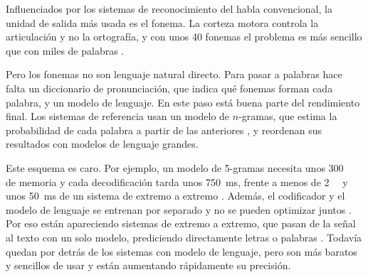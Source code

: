 Influenciados por los sistemas de reconocimiento del habla convencional, la unidad de salida más usada es el fonema. La corteza motora controla la articulación y no la ortografía, y con unos 40 fonemas el problema es más sencillo que con miles de palabras \cite{willett2023}.

Pero los fonemas no son lenguaje natural directo. Para pasar a palabras hace falta un diccionario de pronunciación, que indica qué fonemas forman cada palabra, y un modelo de lenguaje. En este paso está buena parte del rendimiento final. Los sistemas de referencia usan un modelo de $n$-gramas, que estima la probabilidad de cada palabra a partir de las anteriores \cite{jurafsky2026slp}, y reordenan sus resultados con modelos de lenguaje grandes.

Este esquema es caro. Por ejemplo, un modelo de 5-gramas necesita unos \SI{300}{\giga\byte} de memoria y cada decodificación tarda unos \SI{750}{\milli\second}, frente a menos de \SI{2}{\giga\byte} y unos \SI{50}{\milli\second} de un sistema de extremo a extremo \cite{brainwhisperer}. Además, el codificador y el modelo de lenguaje se entrenan por separado y no se pueden optimizar juntos \cite{crossspecies2025}. Por eso están apareciendo sistemas de extremo a extremo, que pasan de la señal al texto con un solo modelo, prediciendo directamente letras o palabras \cite{khanday2026,brainwhisperer}. Todavía quedan por detrás de los sistemas con modelo de lenguaje, pero son más baratos y sencillos de usar y están aumentando rápidamente su precisión.





